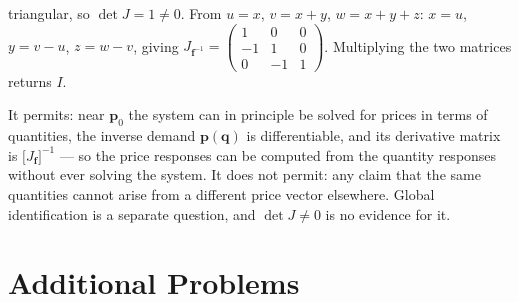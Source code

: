 \begin{solutions}
        triangular, so $\det J=1\neq0$. From $u=x$, $v=x+y$, $w=x+y+z$:
        $x=u$, $y=v-u$, $z=w-v$, giving
        $J_{\mathbf{f}^{-1}}=\begin{pmatrix}1&0&0\\-1&1&0\\
        0&-1&1\end{pmatrix}$. Multiplying the two matrices returns $I$.
        \checkmark
  \item It permits: near $\mathbf{p}_{0}$ the system can in principle be
        solved for prices in terms of quantities, the inverse demand
        $\mathbf{p}(\mathbf{q})$ is differentiable, and its derivative
        matrix is $\bigl[J_{\mathbf{f}}\bigr]^{-1}$ --- so the price
        responses can be computed from the quantity responses without ever
        solving the system. It does not permit: any claim that the same
        quantities cannot arise from a different price vector elsewhere.
        Global identification is a separate question, and $\det J\neq0$ is
        no evidence for it.
\end{solutions}

\section{Additional Problems}

